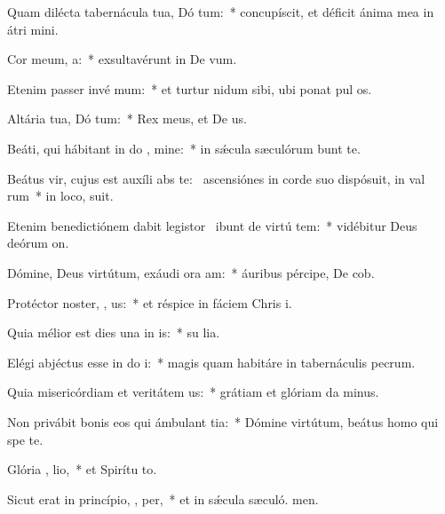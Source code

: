 \item Quam dilécta tabernácula tua, Dó tum:~* concupíscit, et déficit ánima mea in átri mini.
\item Cor meum,   a:~* exsultavérunt in De vum.
\item Etenim passer invé  mum:~* et turtur nidum sibi, ubi ponat pul os.
\item Altária tua, Dó tum:~* Rex meus, et De us.
\item Beáti, qui hábitant in do , mine:~* in sǽcula sæculórum bunt te.
\item Beátus vir, cujus est auxíli abs te:~\pscross{} ascensiónes in corde suo dispósuit, in val rum~* in loco,  suit.
\item Etenim benedictiónem dabit legistor~\pscross{} ibunt de virtú  tem:~* vidébitur Deus deórum  on.
\item Dómine, Deus virtútum, exáudi ora am:~* áuribus pércipe, De cob.
\item Protéctor noster, , us:~* et réspice in fáciem Chris i.
\item Quia mélior est dies una in  is:~* su lia.
\item Elégi abjéctus esse in do  i:~* magis quam habitáre in tabernáculis pecrum.
\item Quia misericórdiam et veritátem  us:~* grátiam et glóriam da minus.
\item Non privábit bonis eos qui ámbulant  tia:~* Dómine virtútum, beátus homo qui spe  te.
\item Glória ,  lio,~* et Spirítu to.
\item Sicut erat in princípio,  ,  per,~* et in sǽcula sæculó. men.
